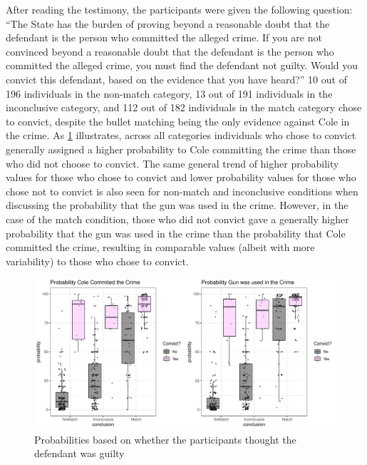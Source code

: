 \documentclass[print]{nuthesis}
\begin{document}
After reading the testimony, the participants were given the following question:
``The State has the burden of proving beyond a reasonable doubt that the defendant is the person who committed the alleged crime.
If you are not convinced beyond a reasonable doubt that the defendant is the person who committed the alleged crime, you must find the defendant not guilty.
Would you convict this defendant, based on the evidence that you have heard?''
10 out of 196 individuals in the non-match category, 13 out of 191 individuals in the inconclusive category, and 112 out of 182 individuals in the match category chose to convict, despite the bullet matching being the only evidence against Cole in the crime.
As \ref{fig:probguilt} illustrates, across all categories individuals who chose to convict generally assigned a higher probability to Cole committing the crime than those who did not choose to convict.
The same general trend of higher probability values for those who chose to convict and lower probability values for those who chose not to convict is also seen for non-match and inconclusive conditions when discussing the probability that the gun was used in the crime.
However, in the case of the match condition, those who did not convict gave a generally higher probability that the gun was used in the crime than the probability that Cole committed the crime, resulting in comparable values (albeit with more variability) to those who chose to convict.

\begin{figure}

{\centering \includegraphics[width=\linewidth]{thesis_files/figure-latex/probguilt-1} 

}

\caption{Probabilities based on whether the participants thought the defendant was guilty}\label{fig:probguilt}
\end{figure}
\end{document}
